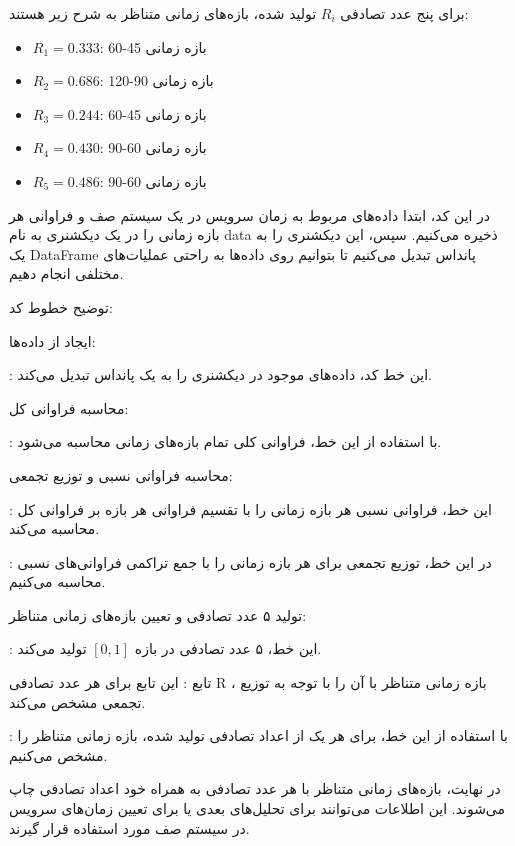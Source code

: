 برای پنج عدد تصادفی \( R_i \) تولید شده، بازه‌های زمانی متناظر به شرح زیر هستند:

\begin{itemize}
	\item \( R_1 = 0.333 \): بازه زمانی 45-60
	\item \( R_2 = 0.686 \): بازه زمانی 90-120
	\item \( R_3 = 0.244 \): بازه زمانی 45-60
	\item \( R_4 = 0.430 \): بازه زمانی 60-90
	\item \( R_5 = 0.486 \): بازه زمانی 60-90
\end{itemize}

در این کد، ابتدا داده‌های مربوط به زمان سرویس در یک سیستم صف و فراوانی هر بازه زمانی را در یک دیکشنری به نام data ذخیره می‌کنیم. سپس، این دیکشنری را به یک DataFrame پانداس تبدیل می‌کنیم تا بتوانیم روی داده‌ها به راحتی عملیات‌های مختلفی انجام دهیم.

توضیح خطوط کد:

ایجاد
از داده‌ها:

:
این خط کد، داده‌های موجود در دیکشنری
را به یک
پانداس تبدیل می‌کند.

محاسبه فراوانی کل:

:
با استفاده از این خط، فراوانی کلی تمام بازه‌های زمانی محاسبه می‌شود.

محاسبه فراوانی نسبی و توزیع تجمعی:

:
این خط، فراوانی نسبی هر بازه زمانی را با تقسیم فراوانی هر بازه بر فراوانی کل محاسبه می‌کند.

:
در این خط، توزیع تجمعی برای هر بازه زمانی را با جمع تراکمی فراوانی‌های نسبی محاسبه می‌کنیم.

تولید ۵ عدد تصادفی و تعیین بازه‌های زمانی متناظر:

:
این خط، ۵ عدد تصادفی در بازه
$[0,1]$
تولید می‌کند.

تابع 
:
این تابع برای هر عدد تصادفی R ، بازه زمانی متناظر با آن را با توجه به توزیع تجمعی مشخص می‌کند.

:
با استفاده از این خط، برای هر یک از اعداد تصادفی تولید شده، بازه زمانی متناظر را مشخص می‌کنیم.

در نهایت، بازه‌های زمانی متناظر با هر عدد تصادفی به همراه خود اعداد تصادفی چاپ می‌شوند. این اطلاعات می‌توانند برای تحلیل‌های بعدی یا برای تعیین زمان‌های سرویس در سیستم صف مورد استفاده قرار گیرند.